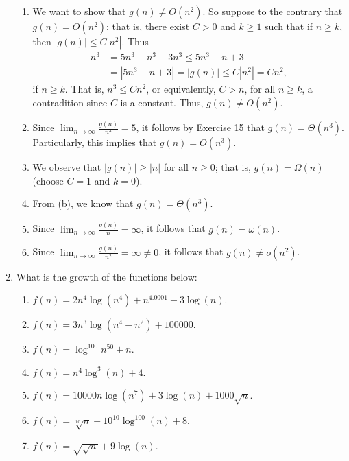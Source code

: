 \documentclass[9pt]{article}
\begin{document}
\begin{enumerate}
      \begin{enumerate}
         \item We want to show that $g(n) \neq O(n^2)$. So suppose to the
               contrary that $g(n) = O(n^2)$; that is, there exist $C > 0$ and
               $k \ge 1$ such that if $n \ge k$, then $|g(n)| \le C|n^2|$. Thus
               \begin{align*}
                  n^3 &= 5n^3 - n^3 - 3n^3 \le 5n^3 - n + 3 \\
                      &= |5n^3 - n + 3| = |g(n)| \le C|n^2| = Cn^2,
               \end{align*}
               if $n \ge k$. That is, $n^3 \le Cn^2$, or equivalently, $C > n$,
               for all $n \ge k$, a contradition since $C$ is a constant. Thus,
               $g(n) \neq O(n^2)$.
         \item Since $\lim_{n \rightarrow \infty}\frac{g(n)}{n^3} = 5$, it
               follows by Exercise 15 that $g(n) = \Theta(n^3)$. Particularly,
               this implies that $g(n) = O(n^3)$.
         \item We observe that $|g(n)| \ge |n|$ for all $n \ge 0$; that is,
               $g(n) = \Omega(n)$ (choose $C = 1$ and $k = 0$).
         \item From (b), we know that $g(n) = \Theta(n^3)$.
         \item Since $\lim_{n \rightarrow \infty}\frac{g(n)}{n} = \infty$, it
               follows that $g(n) = \omega(n)$.
         \item Since $\lim_{n \rightarrow \infty}\frac{g(n)}{n^2} =
               \infty \neq 0$, it follows that $g(n) \neq o(n^2)$.
      \end{enumerate}
   \item What is the growth of the functions below:
         \begin{enumerate}
            \item $f(n) = 2n^4\log(n^4) + n^{4.0001}-3\log(n)$.
            \item $f(n) = 3n^3\log(n^4-n^2)+100000$.
            \item $f(n) = \log^{100}n^{50} + n$.
            \item $f(n) = n^4\log^3(n)+4$.
            \item $f(n) = 10000n\log(n^7)+3\log(n)+1000\sqrt{n}$.
            \item $f(n) = \sqrt[10]{n}+10^{10}\log^{100}(n)+8$.
            \item $f(n) = \sqrt{\sqrt{n}}+9\log(n)$.
         \end{enumerate}


\end{enumerate}
\end{document}
